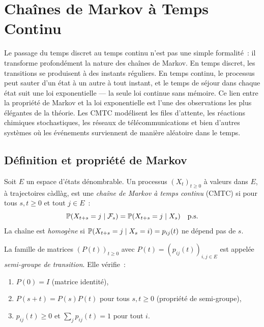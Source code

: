 \chapter{Cha\^ines de Markov \`a Temps Continu}
\label{ch:markov_continu}

Le passage du temps discret au temps continu n'est pas une simple formalit\'e~: il transforme profond\'ement la nature des cha\^ines de Markov. En temps discret, les transitions se produisent \`a des instants r\'eguliers. En temps continu, le processus peut sauter d'un \'etat \`a un autre \`a tout instant, et le temps de s\'ejour dans chaque \'etat suit une loi exponentielle --- la seule loi continue sans m\'emoire. Ce lien entre la propri\'et\'e de Markov et la loi exponentielle est l'une des observations les plus \'el\'egantes de la th\'eorie. Les CMTC mod\'elisent les files d'attente, les r\'eactions chimiques stochastiques, les r\'eseaux de t\'el\'ecommunications et bien d'autres syst\`emes o\`u les \'ev\'enements surviennent de mani\`ere al\'eatoire dans le temps.

\section{D\'efinition et propri\'et\'e de Markov}

\begin{definition}
Soit $E$ un espace d'\'etats d\'enombrable. Un processus $(X_t)_{t \geq 0}$
\`a valeurs dans $E$, \`a trajectoires c\`adl\`ag, est une \emph{cha\^ine de Markov
\`a temps continu} (CMTC) si pour tous $s, t \geq 0$ et tout $j \in E$~:
\[
  \mathbb{P}(X_{t+s} = j \mid \mathcal{F}_s) = \mathbb{P}(X_{t+s} = j \mid X_s) \quad \text{p.s.}
\]
La cha\^ine est \emph{homog\`ene} si $\mathbb{P}(X_{t+s} = j \mid X_s = i) = p_{ij}(t)$
ne d\'epend pas de $s$.
\end{definition}

\begin{definition}
La famille de matrices $(P(t))_{t \geq 0}$ avec $P(t) = (p_{ij}(t))_{i,j \in E}$
est appel\'ee \emph{semi-groupe de transition}. Elle v\'erifie~:
\begin{enumerate}
  \item $P(0) = I$ (matrice identit\'e),
  \item $P(s+t) = P(s) P(t)$ pour tous $s, t \geq 0$ (propri\'et\'e de semi-groupe),
  \item $p_{ij}(t) \geq 0$ et $\sum_j p_{ij}(t) = 1$ pour tout $i$.
\end{enumerate}
\end{definition}

